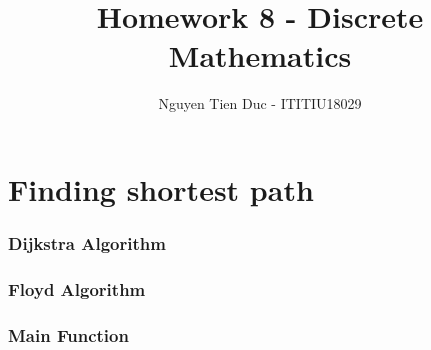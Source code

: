 \documentclass[12pt]{article}
\begin{document}
  \title{Homework 8 - Discrete Mathematics}
  \author{Nguyen Tien Duc - ITITIU18029}
  \maketitle
  \part{Finding shortest path}
    \section*{Dijkstra Algorithm}
      
    \section*{Floyd Algorithm}
      
    \section*{Main Function}
      
\end{document}

